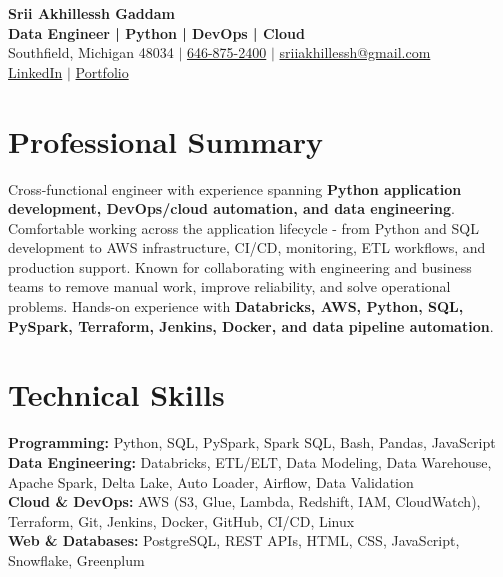 \documentclass[letterpaper,10pt]{article}
\begin{document}
\fontsize{9.35pt}{10.45pt}\selectfont

\begin{center}
    {\LARGE \textbf{Srii Akhillessh Gaddam}} \\[-1pt]
    \textbf{Data Engineer | Python | DevOps | Cloud} \\[2pt]
    Southfield, Michigan 48034 $|$
    \href{tel:6468752400}{646-875-2400} $|$
    \href{mailto:sriiakhillessh@gmail.com}{sriiakhillessh@gmail.com} \\[1pt]
    \href{https://www.linkedin.com/in/srii-akhiilessh-gaddam-b48668191/}{LinkedIn} $|$
    \href{https://sriiakhillesshg.github.io/portfolio/}{Portfolio}
\end{center}
\vspace{-8pt}

\section{Professional Summary}
\small{Cross-functional engineer with experience spanning \textbf{Python application development, DevOps/cloud automation, and data engineering}. Comfortable working across the application lifecycle - from Python and SQL development to AWS infrastructure, CI/CD, monitoring, ETL workflows, and production support. Known for collaborating with engineering and business teams to remove manual work, improve reliability, and solve operational problems. Hands-on experience with \textbf{Databricks, AWS, Python, SQL, PySpark, Terraform, Jenkins, Docker, and data pipeline automation}.}

\section{Technical Skills}
\small{
\textbf{Programming:} Python, SQL, PySpark, Spark SQL, Bash, Pandas, JavaScript \\
\textbf{Data Engineering:} Databricks, ETL/ELT, Data Modeling, Data Warehouse, Apache Spark, Delta Lake, Auto Loader, Airflow, Data Validation \\
\textbf{Cloud \& DevOps:} AWS (S3, Glue, Lambda, Redshift, IAM, CloudWatch), Terraform, Git, Jenkins, Docker, GitHub, CI/CD, Linux \\
\textbf{Web \& Databases:} PostgreSQL, REST APIs, HTML, CSS, JavaScript, Snowflake, Greenplum
}
\end{document}
